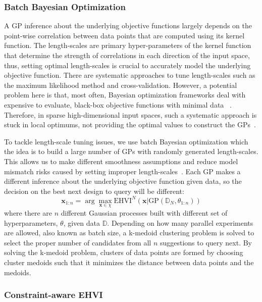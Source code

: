 \subsubsection{Batch Bayesian Optimization}


A GP inference about the underlying objective functions largely depends on the point-wise correlation between data points that are computed using its kernel function. The length-scales are primary hyper-parameters of the kernel function that determine the strength of correlations in each direction of the input space, thus, setting optimal length-scales is crucial to accurately model the underlying objective function. There are systematic approaches to tune length-scales such as the maximum likelihood method \cite{Rasmussen:2005:GPM:1162254} and cross-validation. 
However, a potential problem here is that, most often, Bayesian optimization frameworks deal with expensive to evaluate, black-box objective functions with minimal data ~\cite{joy2020batch}. Therefore, in sparse high-dimensional input spaces, such a systematic approach is stuck in local optimums, not providing the optimal values to construct the GPs~\cite{couperthwaite2020materials}.

To tackle length-scale tuning issues, we use batch Bayesian optimization which the idea is to build a large number of GPs with randomly generated length-scales. This allows us to make different smoothness assumptions and reduce model mismatch risks caused by setting improper length-scales~\cite{joy2020batch}. Each GP makes a different inference about the underlying objective function given data, so the decision on the best next design to query will be different:
\begin{equation}
    \textbf{x}_{1:n} = \arg\max_{\mathbf{x} \in \chi}  \textrm{EHVI}^{N}(\textbf{x} | \textrm{GP}(\mathbb{D}_N,\theta_{1:n}))
\end{equation}
where there are $n$ different Gaussian processes built with different set of hyperparameters, $\theta$, given data $\mathbb{D}$. Depending on how many parallel experiments are allowed, also known as batch size, a k-medoid clustering problem is solved to select the proper number of candidates from all $n$ suggestions to query next. By solving the k-medoid problem, clusters of data points are formed by choosing cluster medoids such that it minimizes the distance between data points and the medoids.

\subsubsection{Constraint-aware EHVI}


